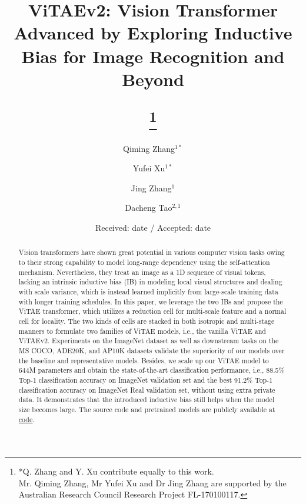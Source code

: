 \documentclass[twocolumn]{svjour3}          \smartqed  \usepackage{natbib}
\begin{document}
\title{ViTAEv2: Vision Transformer Advanced by Exploring Inductive Bias for Image Recognition and Beyond

\thanks{*Q. Zhang and Y. Xu  contribute equally to this work.\\Mr. Qiming Zhang, Mr Yufei Xu and Dr Jing Zhang are supported by the Australian Research Council Research Project FL-170100117.}
}

\author{Qiming Zhang$^{1*}$         \and
        Yufei Xu$^{1*}$ \and
        Jing Zhang$^{1}$ \and
        Dacheng Tao$^{2,1}$
}


\date{Received: date / Accepted: date}
\maketitle

\begin{abstract}
Vision transformers have shown great potential in various computer vision tasks owing to their strong capability to model long-range dependency using the self-attention mechanism. Nevertheless, they treat an image as a 1D sequence of visual tokens, lacking an intrinsic inductive bias (IB) in modeling local visual structures and dealing with scale variance, which is instead learned implicitly from large-scale training data with longer training schedules. In this paper, we leverage the two IBs and propose the ViTAE transformer, which utilizes a reduction cell for multi-scale feature and a normal cell for locality. The two kinds of cells are stacked in both isotropic and multi-stage manners to formulate two families of ViTAE models, i.e., the vanilla ViTAE and ViTAEv2. Experiments on the ImageNet dataset as well as downstream tasks on the MS COCO, ADE20K, and AP10K datasets validate the superiority of our models over the baseline and representative models. Besides, we scale up our ViTAE model to 644M parameters and obtain the state-of-the-art classification performance, i.e., 88.5\% Top-1 classification accuracy on ImageNet validation set and the best 91.2\% Top-1 classification accuracy on ImageNet Real validation set, without using extra private data. It demonstrates that the introduced inductive bias still helps when the model size becomes large. The source code and pretrained models are publicly available at \href{https://github.com/ViTAE-Transformer/ViTAE-Transformer}{code}.

\end{abstract}
\end{document}
